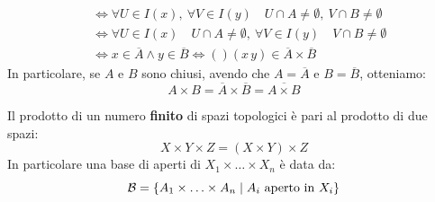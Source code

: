 \begin{demonstration}
\begin{enumerate}[label=\Roman*]
\begin{align*}
			&\iff \forall U\in I\left(x\right),\ \forall V\in I\left(y\right)\quad U\cap A\neq \emptyset ,\ V\cap B\neq \emptyset\\
			&\iff \forall U\in I\left(x\right)\quad U\cap A\neq \emptyset ,\ \forall V\in I\left(y\right)\quad V\cap B\neq \emptyset\\
			&\iff x\in\overline{A}\wedge y\in \overline{B}\iff\left(\right)\left(x\, y\right)\in\overline{A}\times \overline{B}
		\end{align*}
		In particolare, se $A$ e $B$ sono chiusi, avendo che $A=\overline{A}$ e $B=\overline{B}$, otteniamo:
		\begin{equation*}
			A\times B=\overline{A}\times \overline{B}=\overline{A\times B}
		\end{equation*}
	\end{enumerate}
\end{demonstration}
\begin{observe}
	Il prodotto di un numero \textbf{finito} di spazi topologici è pari al prodotto di due spazi:
	\begin{equation*}
		X\times Y\times Z=\left(X\times Y\right)\times Z
	\end{equation*}
	In particolare una base di aperti di $X_1\times \ldots \times X_n$ è data da:
	\begin{equation*}
		\mathcal{B}=\left\{A_1\times \ldots \times A_n\mid A_i\text{ aperto in } X_i\right\}
	\end{equation*}
\end{observe}
